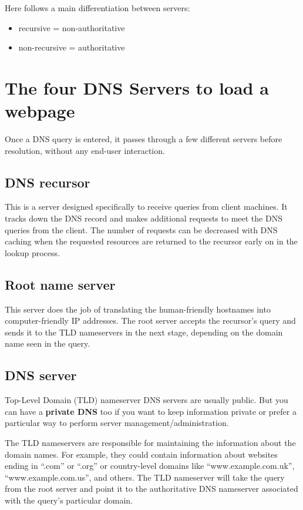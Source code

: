 \documentclass[a4paper,12pt]{book}
\begin{document}
Here follows a main differentiation between servers:
\begin{itemize}
\item{recursive = non-authoritative}
\item{non-recursive = authoritative}
\end{itemize}


\section{The four DNS Servers to load a webpage}
Once a DNS query is entered, it passes through a few different servers before resolution, without any end-user interaction.

\subsection{DNS recursor}

This is a server designed specifically to receive queries from client machines. It tracks down the DNS record and makes additional requests to meet the DNS queries from the client. The number of requests can be decreased with DNS caching when the requested resources are returned to the recursor early on in the lookup process.

\subsection{Root name server}

This server does the job of translating the human-friendly hostnames into computer-friendly IP addresses. The root server accepts the recursor’s query and sends it to the TLD nameservers in the next stage, depending on the domain name seen in the query.

\subsection{DNS server}

Top-Level Domain (TLD) nameserver DNS servers are usually public. But you can have a \textbf{private DNS} too if you want to keep information private or prefer a particular way to perform server management/administration.

The TLD nameservers are responsible for maintaining the information about the domain names. For example, they could contain information about websites ending in “.com” or “.org” or country-level domains like “www.example.com.uk”, “www.example.com.us”, and others. The TLD nameserver will take the query from the root server and point it to the authoritative DNS nameserver associated with the query’s particular domain.
\end{document}
